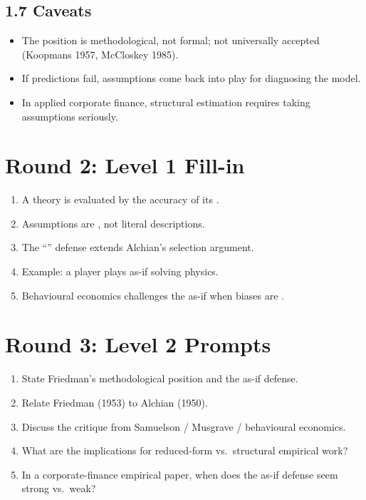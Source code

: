 \documentclass[11pt]{article}
\newcommand{\blank}[1]{\underline{\hspace{#1}}}
\begin{document}
\subsection*{1.7 Caveats}
\begin{alertbox}
\begin{itemize}
\item The position is methodological, not formal; not universally accepted (Koopmans 1957, McCloskey 1985).
\item If predictions fail, assumptions come back into play for diagnosing the model.
\item In applied corporate finance, structural estimation requires taking assumptions seriously.
\end{itemize}
\end{alertbox}

\section*{Round 2: Level 1 Fill-in}
\begin{enumerate}
\item A theory is evaluated by the accuracy of its \blank{2cm}.
\item Assumptions are \blank{2cm}, not literal descriptions.
\item The ``\blank{2cm}'' defense extends Alchian's selection argument.
\item Example: a \blank{2cm} player plays as-if solving physics.
\item Behavioural economics challenges the as-if when biases are \blank{2cm}.
\end{enumerate}

\section*{Round 3: Level 2 Prompts}
\begin{enumerate}
\item State Friedman's methodological position and the as-if defense.
\item Relate Friedman (1953) to Alchian (1950).
\item Discuss the critique from Samuelson / Musgrave / behavioural economics.
\item What are the implications for reduced-form vs.\ structural empirical work?
\item In a corporate-finance empirical paper, when does the as-if defense seem strong vs.\ weak?
\end{enumerate}
\end{document}
